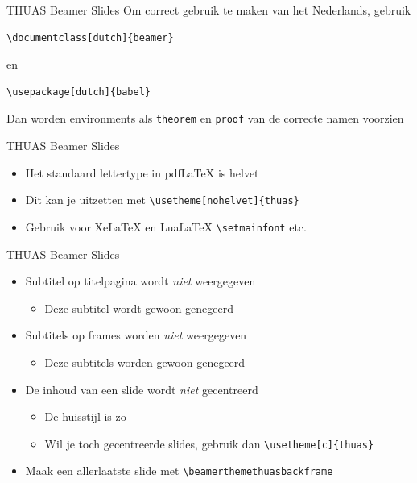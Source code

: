 \documentclass[fleqn,aspectratio=169,dutch]{beamer}
\begin{document}
\begin{frame}[fragile]{THUAS Beamer Slides}
Om correct gebruik te maken van het Nederlands, gebruik
\begin{lstlisting}
\documentclass[dutch]{beamer}
\end{lstlisting}
en
\begin{lstlisting}
\usepackage[dutch]{babel}
\end{lstlisting}
Dan worden environments als \lstinline|theorem| en \lstinline|proof| van de correcte namen voorzien
\end{frame}

\begin{frame}[fragile]{THUAS Beamer Slides}
\begin{itemize}
\item Het standaard lettertype in pdf\LaTeX{} is helvet
\item Dit kan je uitzetten met \lstinline|\usetheme[nohelvet]{thuas}|
\item Gebruik voor Xe\LaTeX{} en Lua\LaTeX{} \lstinline|\setmainfont| etc.
\end{itemize}
\end{frame}

\begin{frame}[fragile]{THUAS Beamer Slides}
\begin{itemize}
\item Subtitel op titelpagina wordt \emph{niet} weergegeven
\begin{itemize}
\item Deze subtitel wordt gewoon genegeerd
\end{itemize}
\item Subtitels op frames worden \emph{niet} weergegeven
\begin{itemize}
\item Deze subtitels worden gewoon genegeerd
\end{itemize}
\item De inhoud van een slide wordt \emph{niet} gecentreerd
\begin{itemize}
\item De huisstijl is zo
\item Wil je toch gecentreerde slides, gebruik dan \lstinline|\usetheme[c]{thuas}|
\end{itemize}
\item Maak een allerlaatste slide met \lstinline|\beamerthemethuasbackframe|
\end{itemize}
\end{frame}
\end{document}
